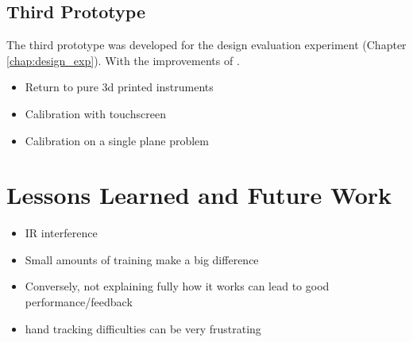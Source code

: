 \subsection{Third Prototype}

The third prototype was developed for the design evaluation experiment (Chapter \ref{chap:design_exp}).
With the improvements of .

\begin{itemize}
    \item Return to pure 3d printed instruments
    \item Calibration with touchscreen
    \item Calibration on a single plane problem
\end{itemize}

\section{Lessons Learned and Future Work}

\begin{itemize}
    \item IR interference
    \item Small amounts of training make a big difference
    \item Conversely, not explaining fully how it works can lead to good performance/feedback
    \item hand tracking difficulties can be very frustrating
\end{itemize}
